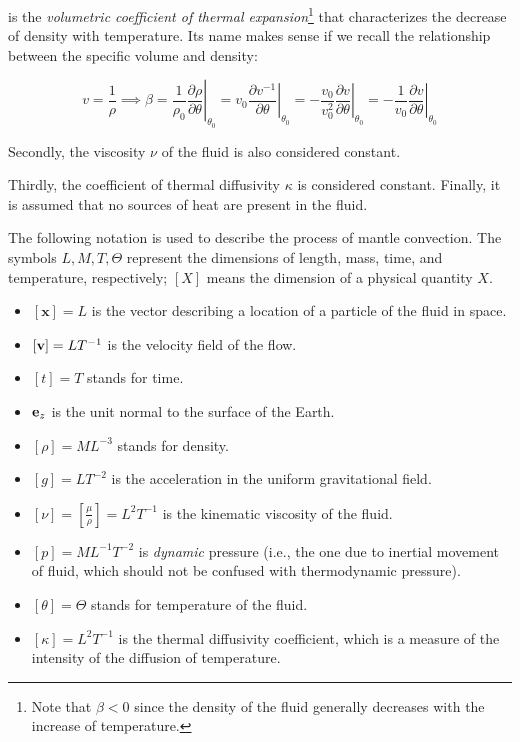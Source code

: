 is the \emph{volumetric coefficient of thermal expansion}\footnote{Note that $\beta < 0 $ since the density of the fluid generally decreases with the increase of temperature.} that characterizes the decrease of density with temperature. Its name makes sense if we recall the relationship between the specific volume and density:

$$ v = \frac{1}{\rho} \implies \beta = \left. \frac{1}{\rho_0}\frac{\partial \rho}{\partial \theta} \right|_{\theta_0} = \left. v_0 \frac{\partial v^{-1}}{\partial \theta} \right|_{\theta_0} = \left. -\frac{v_0}{v_0^2} \frac{\partial v}{\partial \theta} \right|_{\theta_0} = \left. -\frac{1}{v_0} \frac{\partial v}{\partial \theta} \right|_{\theta_0} $$

Secondly, the viscosity $\nu$ of the fluid is also considered constant.

Thirdly, the coefficient of thermal diffusivity $\kappa$ is considered constant. Finally, it is assumed that no sources of heat are present in the fluid.

The following notation is used to describe the process of mantle convection. The symbols $L, M, T, \Theta$ represent the dimensions of length, mass, time, and temperature, respectively; $[X]$ means the dimension of a physical quantity $X$.

\begin{itemize}

\item[] $ [\mathbf{x}] = L $ is the vector describing a location of a particle of the fluid in space.
\item[] $ [\mathbf{v}] = L T^{-1} $ is the velocity field of the flow.
\item[] $ [t] = T $ stands for time.
\item[] $\mathbf{e}_z$ is the unit normal to the surface of the Earth.
\item[] $ [\rho] = M L^{-3} $ stands for density.
\item[] $[g] = LT^{-2} $ is the acceleration in the uniform gravitational field.
\item[] $ [\nu] = [\frac{\mu}{\rho}] = L^{2} T^{-1} $ is the kinematic viscosity of the fluid.
\item[] $ [p] = M L^{-1} T^{-2} $ is \emph{dynamic} pressure (i.e., the one due to inertial movement of fluid, which should not be confused with thermodynamic pressure).
\item[] $ [\theta] = \Theta $ stands for temperature of the fluid.
\item[] $ [\kappa] = L^{2} T^{-1} $ is the thermal diffusivity coefficient, which is a measure of the intensity of the diffusion of temperature.

\end{itemize}

